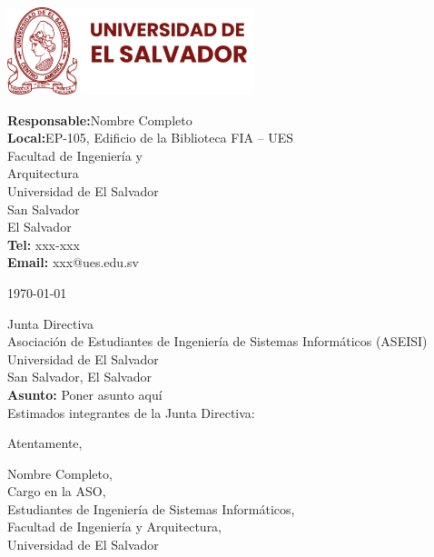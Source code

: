 \documentclass[12pt, a4paper]{letter} %
\begin{document}
\begin{minipage}{0.6\textwidth}
\includegraphics[height=1in]{Logos/ues-logo.png}
\end{minipage}
\hfill
\begin{minipage}{0.4\textwidth}\raggedright
\small{\textbf{\color{umdred}Responsable:}\hphantom{A}Nombre Completo\\
\textbf{\color{umdred}Local:}\hphantom{A}EP-105, Edificio de la Biblioteca FIA -- UES\\
\hphantom{AA}Facultad de Ingeniería y\\
\hphantom{AA}Arquitectura\\
\hphantom{AA}Universidad de El Salvador\\
\hphantom{AA}San Salvador\\
\hphantom{AA}El Salvador\\
\textbf{\color{umdred}Tel: } xxx-xxx\\
\textbf{\color{umdred}Email: }xxx@ues.edu.sv }
\end{minipage}

\today

Junta Directiva\\
Asociación de Estudiantes de Ingeniería de Sistemas Informáticos (ASEISI)\\
Universidad de El Salvador\\
San Salvador, El Salvador\\

\textbf{Asunto:} Poner asunto aquí\\

Estimados integrantes de la Junta Directiva:

\lipsum[1]

\lipsum[2]



Atentamente,

\vspace{1.3cm}

Nombre Completo,\\
Cargo en la ASO,\\
Estudiantes de Ingeniería de Sistemas Informáticos,\\
Facultad de Ingeniería y Arquitectura,\\
Universidad de El Salvador
\end{document}
